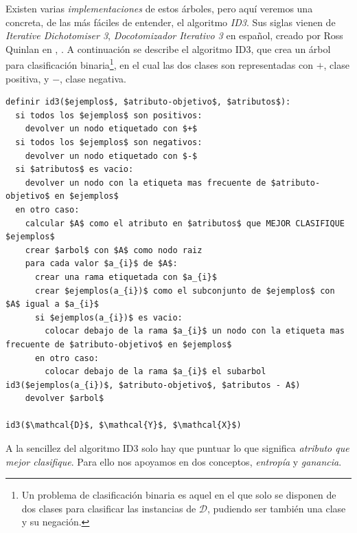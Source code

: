 Existen varias \emph{implementaciones} de estos árboles, pero aquí veremos una concreta, de las más fáciles de entender, el algoritmo \emph{ID3}. Sus siglas vienen de \emph{Iterative Dichotomiser 3}, \emph{Docotomizador Iterativo 3} en español, creado por Ross Quinlan en \citeyear{quinlan1986induction}, \cite{quinlan1986induction}. A continuación se describe el algoritmo ID3, que crea un árbol para clasificación binaria\footnote{Un problema de clasificación binaria es aquel en el que solo se disponen de dos clases para clasificar las instancias de $\mathcal{D}$, pudiendo ser también una clase y su negación.}, en el cual las dos clases son representadas con $+$, clase positiva, y $-$, clase negativa.

\vspace*{3mm}
\lstset{style=pseudocode}
\begin{lstlisting}
definir id3($ejemplos$, $atributo-objetivo$, $atributos$):
  si todos los $ejemplos$ son positivos:
    devolver un nodo etiquetado con $+$
  si todos los $ejemplos$ son negativos:
    devolver un nodo etiquetado con $-$
  si $atributos$ es vacio:
    devolver un nodo con la etiqueta mas frecuente de $atributo-objetivo$ en $ejemplos$
  en otro caso:
    calcular $A$ como el atributo en $atributos$ que MEJOR CLASIFIQUE $ejemplos$
    crear $arbol$ con $A$ como nodo raiz
    para cada valor $a_{i}$ de $A$:
      crear una rama etiquetada con $a_{i}$
      crear $ejemplos(a_{i})$ como el subconjunto de $ejemplos$ con $A$ igual a $a_{i}$
      si $ejemplos(a_{i})$ es vacio:
        colocar debajo de la rama $a_{i}$ un nodo con la etiqueta mas frecuente de $atributo-objetivo$ en $ejemplos$
      en otro caso:
        colocar debajo de la rama $a_{i}$ el subarbol id3($ejemplos(a_{i})$, $atributo-objetivo$, $atributos - A$)
    devolver $arbol$

id3($\mathcal{D}$, $\mathcal{Y}$, $\mathcal{X}$)
\end{lstlisting}

A la sencillez del algoritmo ID3 solo hay que puntuar lo que significa \emph{atributo que mejor clasifique}. Para ello nos apoyamos en dos conceptos, \emph{entropía} y \emph{ganancia}.

